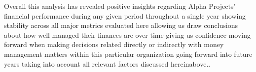 Overall this analysis has revealed positive insights regarding Alpha Projects' financial performance during any given period throughout a single year showing stability across all major metrics evaluated here allowing us draw conclusions about how well managed their finances are over time giving us confidence moving forward when making decisions related directly or indirectly with money management matters within this particular organization going forward into future years taking into account all relevant factors discussed hereinabove..